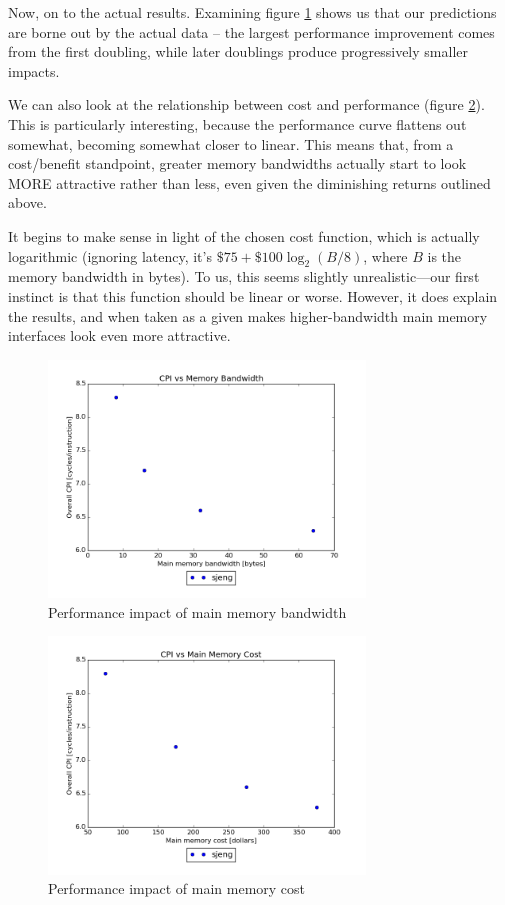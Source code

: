 \documentclass{article}
\begin{document}
Now, on to the actual results. Examining figure \ref{fig:cpivsband} shows us
that our predictions are borne out by the actual data -- the largest performance
improvement comes from the first doubling, while later doublings produce
progressively smaller impacts.

We can also look at the relationship between cost and performance (figure
\ref{fig:cpivsmainmemcost}). This is particularly interesting, because the
performance curve flattens out somewhat, becoming somewhat closer to linear.
This means that, from a cost/benefit standpoint, greater memory bandwidths
actually start to look MORE attractive rather than less, even given the
diminishing returns outlined above.

It begins to make sense in light of the chosen cost function, which is actually
logarithmic (ignoring latency, it's $\$75 + \$100 \log_2(B / 8)$, where $B$ is
the memory bandwidth in bytes). To us, this seems slightly unrealistic---our
first instinct is that this function should be linear or worse. However, it does
explain the results, and when taken as a given makes higher-bandwidth main
memory interfaces look even more attractive.

\begin{figure}[ht]
    \centering
    \includegraphics[width=0.75\textwidth]{plots/CPI_vs_Bandwidth.png}
    \caption{Performance impact of main memory bandwidth}
    \label{fig:cpivsband}
\end{figure}

\begin{figure}[ht]
    \centering
    \includegraphics[width=0.75\textwidth]{plots/CPI_vs_Main_Mem_Cost.png}
    \caption{Performance impact of main memory cost}
    \label{fig:cpivsmainmemcost}
\end{figure}
\end{document}
